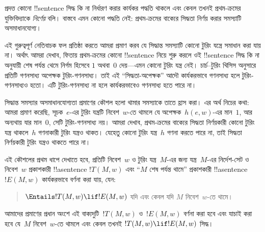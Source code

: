 \documentclass[../../../include/open-logic-section]{subfiles}
\begin{document}

প্রদত্ত কোনো !!{sentence} সিদ্ধ কি না নির্ধারণ করার কার্যকর পদ্ধতি থাকলে
এবং কেবল তখনই প্রথম-ক্রমের যুক্তিবিদ্যাকে \emph{নির্ণেয়} বলি। বাস্তবে এমন
কোনো পদ্ধতি নেই: প্রথম-ক্রমের বাক্যের সিদ্ধতা নির্ণয় করার সমস্যাটি
অসমাধানযোগ্য।

এই গুরুত্বপূর্ণ নেতিবাচক ফল প্রতিষ্ঠা করতে আমরা প্রমাণ করব যে সিদ্ধান্ত
সমস্যাটি কোনো টুরিং যন্ত্রে সমাধান করা যায় না। অর্থাৎ আমরা দেখাব, ফিতায়
প্রথম-ক্রমের কোনো !!{sentence} নিয়ে শুরু করলে ওই !!{sentence} সিদ্ধ কি না অনুযায়ী
শেষ পর্যন্ত থেমে নির্গম হিসেবে $1$ অথবা~$0$ দেয়—এমন কোনো টুরিং যন্ত্র
নেই। চার্চ--টুরিং থিসিস অনুসারে প্রতিটি গণনসাধ্য অপেক্ষক টুরিং-গণনসাধ্য।
তাই এই “সিদ্ধতা-অপেক্ষক” আদৌ কার্যকরভাবে গণনসাধ্য হলে টুরিং-গণনসাধ্যও
হতো। এটি টুরিং-গণনসাধ্য না হলে কার্যকরভাবেও গণনসাধ্য হতে পারে না।

সিদ্ধান্ত সমস্যার অসমাধানযোগ্যতা প্রমাণের কৌশল হলো থামার সমস্যাকে তাতে
হ্রাস করা। এর অর্থ নিচের কথা: আমরা প্রমাণ করেছি, সূচক~$e$-এর টুরিং
যন্ত্রটি নিবেশ~$w$-তে থামলে যে অপেক্ষক~$h(e,w)$-এর মান~$1$, আর
অন্যথায় যার মান~$0$, সেটি টুরিং-গণনসাধ্য নয়। আমরা দেখাব, প্রথম-ক্রমের
বাক্যের সিদ্ধতা নির্ণয়কারী কোনো টুরিং যন্ত্র থাকলে~$h$ গণনাকারী টুরিং
যন্ত্রও থাকত। যেহেতু কোনো টুরিং যন্ত্র~$h$ গণনা করতে পারে না, তাই সিদ্ধতা
নির্ণয়কারী টুরিং যন্ত্রও থাকতে পারে না।

এই কৌশলের প্রথম ধাপে দেখাতে হবে, প্রতিটি নিবেশ~$w$ ও টুরিং যন্ত্র~$M$-এর
জন্য যন্ত্র~$M$-এর নির্দেশ-সেট ও নিবেশ~$w$ প্রকাশকারী !!a{sentence}
$!T(M, w)$ এবং “$M$ শেষ পর্যন্ত থামে” প্রকাশকারী !!a{sentence}~$!E(M, w)$
কার্যকরভাবে বর্ণনা করা যায়, যেন:
\begin{quote}
  $\Entails !T(M, w) \lif !E(M,w)$ যদি এবং কেবল যদি $M$ নিবেশ~$w$-তে থামে।
\end{quote}
আমাদের প্রমাণের প্রধান অংশে এই বাক্যদুটি~$!T(M, w)$ ও~$!E(M, w)$ বর্ণনা
করা হবে এবং যাচাই করা হবে যে~$M$ নিবেশ~$w$-তে থামলে এবং কেবল তখনই
$!T(M, w) \lif !E(M, w)$ সিদ্ধ।
\end{document}
